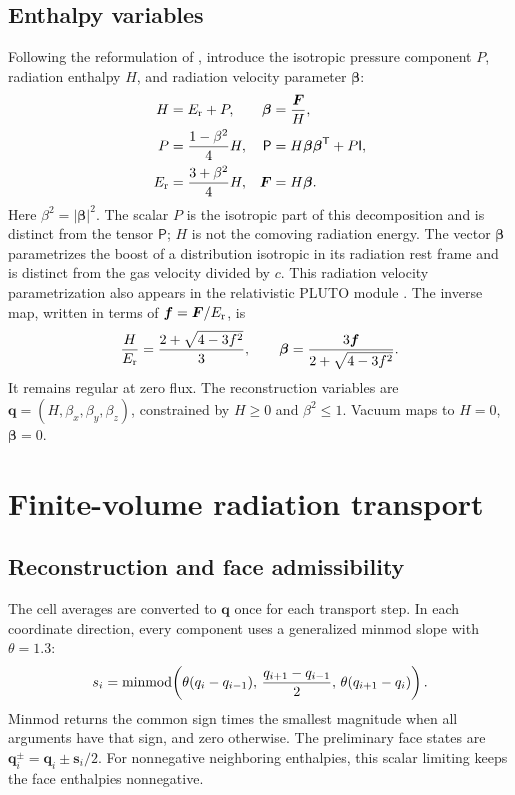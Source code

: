 \documentclass[manuscript]{aastex7}
\newcommand{\vct}[1]{\boldsymbol{#1}}
\newcommand{\Er}{E_{\rm r}}
\newcommand{\Fr}{\vct{F}}
\newcommand{\Prad}{\mathsf{P}}
\newcommand{\Id}{\mathsf{I}}
\begin{document}
\subsection{Enthalpy variables}
Following the reformulation of \citet{HanawaAudit2014}, introduce the
isotropic pressure component $P$, radiation enthalpy $H$, and radiation
velocity parameter $\vct{\beta}$:
\begin{align}
 H&=\Er+P,& \vct{\beta}&=\frac{\Fr}{H},\label{eq:hb}\\
 P&=\frac{1-\beta^2}{4}H,&
 \Prad&=H\vct{\beta}\vct{\beta}^{\mathsf T}+P\Id,\label{eq:hbP}\\
 \Er&=\frac{3+\beta^2}{4}H,& \Fr&=H\vct{\beta}.
 \label{eq:hbE}
\end{align}
Here $\beta^2=|\vct{\beta}|^2$. The scalar $P$ is the isotropic part of
this decomposition and is distinct from the tensor $\Prad$; $H$ is not
the comoving radiation energy. The vector $\vct{\beta}$ parametrizes the
boost of a distribution isotropic in its radiation rest frame and is
distinct from the gas velocity divided by $c$. This radiation velocity
parametrization also appears in the relativistic PLUTO module
\citep{MelonFuksman2019}.
The inverse map, written in terms of $\vct{f}=\Fr/\Er$, is
\begin{equation}
 \frac{H}{\Er}=\frac{2+\sqrt{4-3f^2}}{3},\qquad
 \vct{\beta}=\frac{3\vct{f}}{2+\sqrt{4-3f^2}}.
 \label{eq:inverse}
\end{equation}
It remains regular at zero flux. The reconstruction variables are
$\vct{q}=(H,\beta_x,\beta_y,\beta_z)$, constrained by $H\geq0$ and
$\beta^2\leq1$.
Vacuum maps to $H=0$, $\vct{\beta}=0$.

\section{Finite-volume radiation transport}
\subsection{Reconstruction and face admissibility}
The cell averages are converted to $\vct{q}$ once for each transport step.
In each coordinate direction, every component uses a generalized minmod
slope with $\theta=1.3$:
\begin{equation}
 s_i={\rm minmod}\!\left(
 \theta(q_i-q_{i-1}),\,
 \frac{q_{i+1}-q_{i-1}}{2},\,
 \theta(q_{i+1}-q_i)\right).
 \label{eq:limiter}
\end{equation}
Minmod returns the common sign times the smallest magnitude when all
arguments have that sign, and zero otherwise. The preliminary face states
are $\vct{q}_i^\pm=\vct{q}_i\pm\vct{s}_i/2$. For nonnegative neighboring
enthalpies, this scalar limiting keeps the face enthalpies nonnegative.
\end{document}
